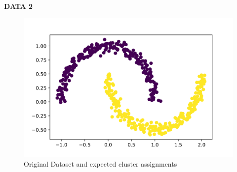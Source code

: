 \documentclass[11pt]{article}
\begin{document}
{\large \textbf{DATA 2}}%
\vspace*{-1cm}
\begin{figure}[H]
    \centering
    \includegraphics[width=0.55\linewidth]{d2.png}
    \caption{Original Dataset and expected cluster assignments}
\end{figure}%
\vspace*{-0.7cm}
\end{document}
